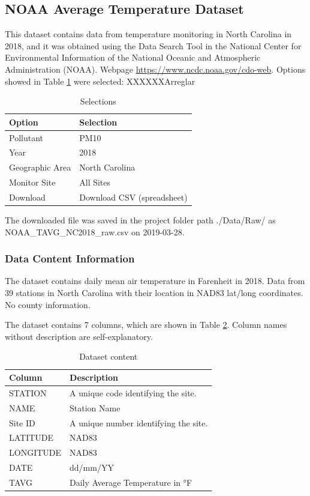 \documentclass[12pt,]{article}
\begin{document}
\subsection{NOAA Average Temperature
Dataset}\label{noaa-average-temperature-dataset}

This dataset contains data from temperature monitoring in North Carolina
in 2018, and it was obtained using the Data Search Tool in the National
Center for Environmental Information of the National Oceanic and
Atmospheric Administration (NOAA). Webpage
\url{https://www.ncdc.noaa.gov/cdo-web}. Options showed in Table
\ref{tab:tab6} were selected: XXXXXXArreglar

\begin{table}[ht]
\centering
\begin{tabular}{ll}
  \hline
Option & Selection \\ 
  \hline
Pollutant & PM10 \\ 
  Year & 2018 \\ 
  Geographic Area & North Carolina \\ 
  Monitor Site & All Sites \\ 
  Download & Download CSV (spreadsheet) \\ 
   \hline
\end{tabular}
\caption{Selections} 
\label{tab:tab6}
\end{table}

The downloaded file was saved in the project folder path ./Data/Raw/ as
NOAA\_TAVG\_NC2018\_raw.csv on 2019-03-28.

\subsubsection{Data Content
Information}\label{data-content-information-2}

The dataset contains daily mean air temperature in Farenheit in 2018.
Data from 39 stations in North Carolina with their location in NAD83
lat/long coordinates. No county information.

The dataset contains 7 columns, which are shown in Table \ref{tab:tab7}.
Column names without description are self-explanatory.

\begin{table}[ht]
\centering
\begin{tabular}{p{2.5in}p{3.5in}}
  \hline
Column & Description \\ 
  \hline
STATION & A unique code identifying the site. \\ 
  NAME & Station Name \\ 
  Site ID & A unique number identifying the site. \\ 
  LATITUDE & NAD83 \\ 
  LONGITUDE & NAD83 \\ 
  DATE & dd/mm/YY \\ 
  TAVG & Daily Average Temperature in °F \\ 
   \hline
\end{tabular}
\caption{Dataset content} 
\label{tab:tab7}
\end{table}
\end{document}
